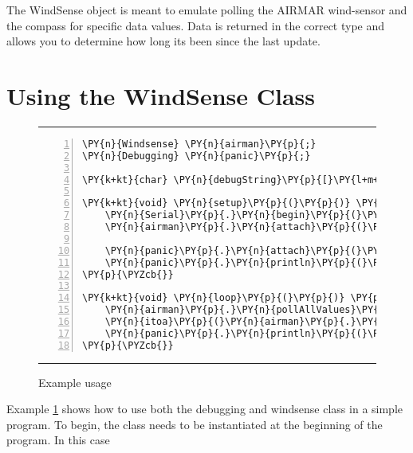 \documentclass[letterpaper]{article}
\newcommand{\HRule}{\rule{\linewidth}{0.5mm}}
\begin{document}
%



The WindSense object is meant to emulate polling the AIRMAR wind-sensor and the compass for specific data values. Data is returned in the correct type and allows you to determine how long its been since the last update.

\section{Using the WindSense Class} %
\label{sec:Using the WindSense Class}
\begin{figure}[h]
	\HRule
\begin{Verbatim}[commandchars=\\\{\},numbers=left,firstnumber=1,stepnumber=1]
\PY{n}{Windsense} \PY{n}{airman}\PY{p}{;}
\PY{n}{Debugging} \PY{n}{panic}\PY{p}{;}

\PY{k+kt}{char} \PY{n}{debugString}\PY{p}{[}\PY{l+m+mi}{50}\PY{p}{]} \PY{o}{=} \PY{p}{\PYZob{}}\PY{l+s+sc}{'\PYZbs{}0'}\PY{p}{\PYZcb{}}\PY{p}{;}

\PY{k+kt}{void} \PY{n}{setup}\PY{p}{(}\PY{p}{)} \PY{p}{\PYZob{}}
    \PY{n}{Serial}\PY{p}{.}\PY{n}{begin}\PY{p}{(}\PY{l+m+mi}{19200}\PY{p}{)}\PY{p}{;}
    \PY{n}{airman}\PY{p}{.}\PY{n}{attach}\PY{p}{(}\PY{n}{Serial}\PY{p}{)}\PY{p}{;}

    \PY{n}{panic}\PY{p}{.}\PY{n}{attach}\PY{p}{(}\PY{n}{Serial}\PY{p}{)}\PY{p}{;}
    \PY{n}{panic}\PY{p}{.}\PY{n}{println}\PY{p}{(}\PY{l+s}{"}\PY{l+s}{Ready for action}\PY{l+s}{"}\PY{p}{)}\PY{p}{;}
\PY{p}{\PYZcb{}}

\PY{k+kt}{void} \PY{n}{loop}\PY{p}{(}\PY{p}{)} \PY{p}{\PYZob{}}
    \PY{n}{airman}\PY{p}{.}\PY{n}{pollAllValues}\PY{p}{(}\PY{p}{)}\PY{p}{;}
    \PY{n}{itoa}\PY{p}{(}\PY{n}{airman}\PY{p}{.}\PY{n}{stupidDebug}\PY{p}{(}\PY{p}{)}\PY{p}{,}\PY{n}{debugString}\PY{p}{,}\PY{l+m+mi}{10}\PY{p}{)}\PY{p}{;}
    \PY{n}{panic}\PY{p}{.}\PY{n}{println}\PY{p}{(}\PY{n}{debugString}\PY{p}{)}\PY{p}{;}
\PY{p}{\PYZcb{}}
\end{Verbatim}
	\HRule
	\caption{Example usage}
	\label{fig:ex1}
\end{figure}

Example \ref{fig:ex1} shows how to use both the debugging and windsense class in a simple program. To begin, the class needs to be instantiated at the beginning of the program. In this case 

\end{document}
